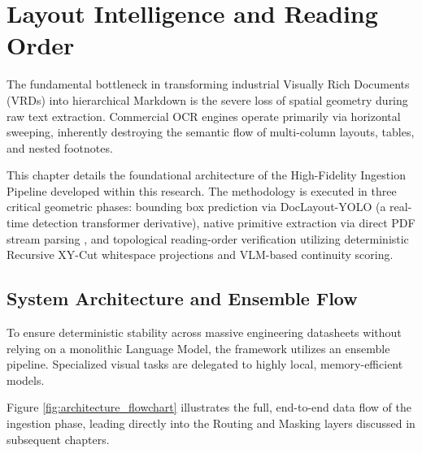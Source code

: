 \chapter{Layout Intelligence and Reading Order}
\label{ch:layout_reading}

The fundamental bottleneck in transforming industrial Visually Rich Documents (VRDs) into hierarchical Markdown is the severe loss of spatial geometry during raw text extraction. Commercial OCR engines operate primarily via horizontal sweeping, inherently destroying the semantic flow of multi-column layouts, tables, and nested footnotes. 

This chapter details the foundational architecture of the High-Fidelity Ingestion Pipeline developed within this research. The methodology is executed in three critical geometric phases: bounding box prediction via DocLayout-YOLO \citep{doclayout_yolo} (a real-time detection transformer derivative), native primitive extraction via direct PDF stream parsing \citep{pdfplumber}, and topological reading-order verification utilizing deterministic Recursive XY-Cut whitespace projections \citep{xycut_ogorman} and VLM-based continuity scoring.

\section{System Architecture and Ensemble Flow}
\label{sec:system_architecture}

To ensure deterministic stability across massive engineering datasheets without relying on a monolithic Language Model, the framework utilizes an ensemble pipeline. Specialized visual tasks are delegated to highly local, memory-efficient models.

Figure \ref{fig:architecture_flowchart} illustrates the full, end-to-end data flow of the ingestion phase, leading directly into the Routing and Masking layers discussed in subsequent chapters.

